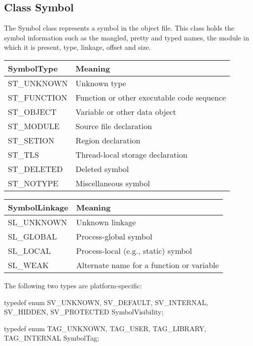 \subsection{Class Symbol}

The Symbol class represents a symbol in the object file. This class holds the symbol information such as the mangled, pretty and typed names, the module in which it is present, type, linkage, offset and size.


\begin{center}
\begin{tabular}{ll}
\toprule
SymbolType & Meaning \\
\midrule
ST\_UNKNOWN & Unknown type \\
ST\_FUNCTION & Function or other executable code sequence \\
ST\_OBJECT & Variable or other data object \\
ST\_MODULE & Source file declaration \\
ST\_SETION & Region declaration \\
ST\_TLS & Thread-local storage declaration \\
ST\_DELETED & Deleted symbol \\
ST\_NOTYPE & Miscellaneous symbol \\
\bottomrule
\end{tabular}


\begin{center}
\begin{tabular}{ll}
\toprule
SymbolLinkage & Meaning \\
\midrule
SL\_UNKNOWN & Unknown linkage \\
SL\_GLOBAL & Process-global symbol \\
SL\_LOCAL & Process-local (e.g., static) symbol \\
SL\_WEAK & Alternate name for a function or variable \\
\bottomrule
\end{tabular}

The following two types are platform-specific:

\begin{apient}
typedef enum {
    SV_UNKNOWN,
    SV_DEFAULT,
    SV_INTERNAL,
    SV_HIDDEN,
    SV_PROTECTED
} SymbolVisibility;
\end{apient}

\begin{apient}
typedef enum {
    TAG_UNKNOWN,
    TAG_USER,
    TAG_LIBRARY,
    TAG_INTERNAL
} SymbolTag; 
\end{apient}


\end{center}
\end{center}
